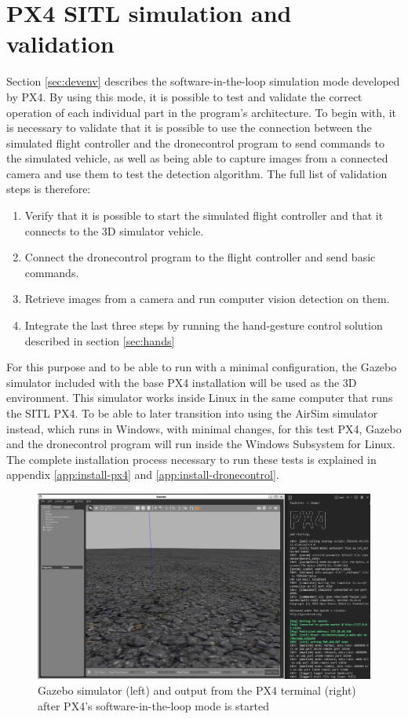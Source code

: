 \section{PX4 SITL simulation and validation}
\label{sec:test-2-sitl}

Section \ref{sec:devenv} describes the software-in-the-loop simulation mode developed by PX4.
By using this mode, it is possible to test and validate the correct operation of each individual part in the program's architecture.
To begin with, it is necessary to validate that it is possible to use the connection between the simulated flight controller and the dronecontrol program to send commands to the simulated vehicle, as well as being able to capture images from a connected camera and use them to test the detection algorithm.
The full list of validation steps is therefore:
\begin{enumerate}
    \item Verify that it is possible to start the simulated flight controller and that it connects to the 3D simulator vehicle.
    \item Connect the dronecontrol program to the flight controller and send basic commands.
    \item Retrieve images from a camera and run computer vision detection on them.
    \item Integrate the last three steps by running the hand-gesture control solution described in section \ref{sec:hands}
\end{enumerate}

For this purpose and to be able to run with a minimal configuration, the Gazebo simulator  included with the base PX4 installation will be used as the 3D environment.
This simulator works inside Linux in the same computer that runs the SITL PX4.
To be able to later transition into using the AirSim simulator instead, which runs in Windows, with minimal changes, for this test PX4, Gazebo and the dronecontrol program will run inside the Windows Subsystem for Linux.
The complete installation process necessary to run these tests is explained in appendix \ref{app:install-px4} and \ref{app:install-dronecontrol}.

\begin{figure}
  \centering
  \includegraphics[width=.8\textwidth, keepaspectratio]{img/gazebo.png}
  \caption{Gazebo simulator (left) and output from the PX4 terminal (right) after PX4's software-in-the-loop mode is started}\label{fig:gazebo}
\end{figure}

